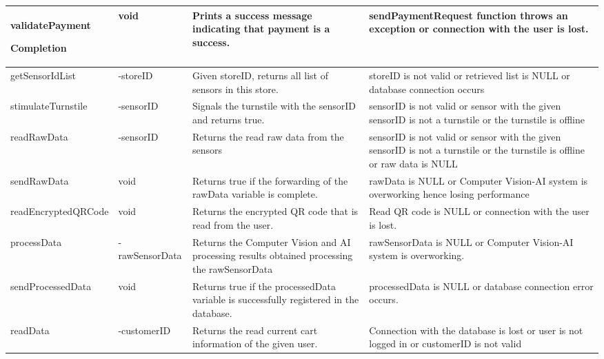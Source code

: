 \documentclass[11pt]{article}
\begin{document}
\begin{longtable}[H]{|p{3.8cm}|p{3cm}|p{4cm}|p{4.5cm}|}
        validatePayment
       
        Completion 
        & void
        & Prints a success message indicating that payment is a success. 
        & sendPaymentRequest function throws an exception or connection with the user is lost.\\ \hline
       
        getSensorIdList 
        & -storeID
        & Given storeID, returns all list of sensors in this store.
        & storeID is not valid or retrieved list is NULL or database connection occurs\\ \hline
       
        stimulateTurnstile 
        & -sensorID
        & Signals the turnstile with the sensorID and returns true.
        & sensorID is not valid or sensor with the given sensorID is not a turnstile or the turnstile is offline\\ \hline
       
        readRawData 
        &-sensorID  
        & Returns the read raw data from the sensors
        & sensorID is not valid or sensor with the given sensorID is not a turnstile or the turnstile is offline or raw data is NULL\\ \hline
       
        sendRawData 
        & void
        & Returns true if the forwarding of the rawData variable is complete.
        & rawData is NULL or Computer Vision-AI system is overworking hence losing performance\\ \hline
       
        readEncryptedQRCode 
        & void
        & Returns the encrypted QR code that is read from the user. 
        & Read QR code is NULL or connection with the user is lost.\\ \hline
       
        processData 
        & -rawSensorData
        & Returns the Computer Vision and AI processing results obtained processing the rawSensorData
        & rawSensorData is NULL or Computer Vision-AI system is overworking.\\ \hline    
       
        sendProcessedData 
        & void
        & Returns true if the processedData variable is successfully registered in the database.
        & processedData is NULL or database connection error occurs.\\ \hline
       
        readData 
        & -customerID
        & Returns the read current cart information of the given user.
        & Connection with the database is lost or user is not logged in or customerID is not valid\\ \hline
       

\end{longtable}
\end{document}
